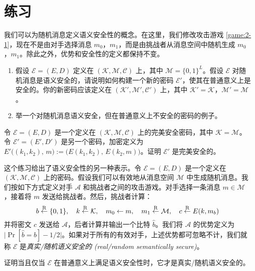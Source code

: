 \section{练习}\label{sec:3-14}

\begin{exercise}[随机消息的语义安全性]\label{exer:3-1}
我们可以为随机消息定义语义安全性的概念。在这里，我们修改攻击游戏 \ref{game:2-1}，现在不是由对手选择消息 $m_0$，$m_1$，而是由挑战者从消息空间中随机生成 $m_0$，$m_1$。除此之外，优势和安全性的定义都保持不变。
\begin{enumerate}[\indent(a)]
	\item 假设 $\mathcal{E}=(E,D)$ 定义在 $(\mathcal{K},\mathcal{M},\mathcal{C})$ 上，其中 $\mathcal{M}=\{0,1\}^L$。假设 $\mathcal{E}$ 对随机消息是语义安全的，请说明如何构建一个新的密码 $\mathcal{E}'$，使其在普通意义上是安全的。你的新密码应该定义在 $(\mathcal{K}',\mathcal{M}',\mathcal{C}')$ 上，其中 $\mathcal{K}'=\mathcal{K}$，$\mathcal{M}'=\mathcal{M}$。
	\item 举一个对随机消息语义安全，但在普通意义上不安全的密码的例子。
\end{enumerate}
\end{exercise}

\begin{exercise}[加密链]\label{exer:3-2}
令 $\mathcal{E}=(E,D)$ 是一个定义在 $(\mathcal{K},\mathcal{M},\mathcal{C})$ 上的完美安全密码，其中 $\mathcal{K}=\mathcal{M}$。令 $\mathcal{E}'=(E',D')$ 是另一个密码，加密定义为 $E'\big((k_1,k_2),\,m\big):=\big(E(k_1,k_2),\,E(k_2,m)\big)$。证明 $\mathcal{E}'$ 是完美安全的。
\end{exercise}

\begin{exercise}[语义安全性的比特猜测定义]\label{exer:3-3}
这个练习给出了语义安全性的另一种表示。令 $\mathcal{E}=(E,D)$ 是一个定义在 $(\mathcal{K},\mathcal{M},\mathcal{C})$ 上的密码。假设我们可以有效地从消息空间 $\mathcal{M}$ 中生成随机消息。我们按如下方式定义对手 $\mathcal{A}$ 和挑战者之间的攻击游戏。对手选择一条消息 $m\in\mathcal{M}$，接着将 $m$ 发送给挑战者。然后，挑战者计算：
\[
b\overset{\rm R}\leftarrow\{0,1\},\quad
k\overset{\rm R}\leftarrow\mathcal{K},\quad
m_0\leftarrow m,\quad
m_1\overset{\rm R}\leftarrow\mathcal{M},\quad
c\overset{\rm R}\leftarrow E(k,m_b)
\]
并将密文 $c$ 发送给 $\mathcal{A}$，后者计算并输出一个比特 $\hat{b}$。我们将 $\mathcal{A}$ 的优势定义为 $\big\lvert\Pr[\hat{b}=b]-1/2\big\rvert$。如果对于所有的有效对手，上述优势都可忽略不计，我们就称 $\mathcal{E}$ 是\emph{真实/随机语义安全的 (real/random semantically secure)}。

\vspace{3pt}

\noindent
证明当且仅当 $\mathcal{E}$ 在普通意义上满足语义安全性时，它才是真实/随机语义安全的。
\end{exercise}

